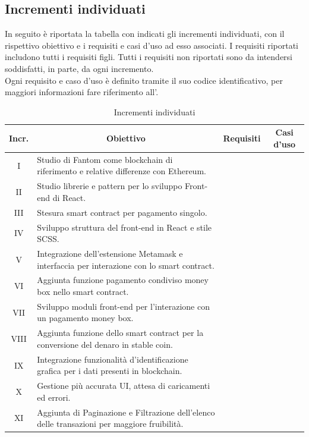 
\subsection{Incrementi individuati} \label{subsection:incrementi}
In seguito è riportata la tabella con indicati gli incrementi individuati, con il rispettivo obiettivo e i requisiti e casi d'uso ad esso associati. 
I requisiti riportati includono tutti i requisiti figli. Tutti i requisiti non riportati sono da intendersi soddisfatti, in parte, da 
ogni incremento. \\
Ogni requisito e caso d'uso è definito tramite il suo codice identificativo, per maggiori informazioni fare riferimento all'\docNameVersionAdR{}.

\begin{table}[H]
  \centering
  \renewcommand{\arraystretch}{1.8}
  \begin{tabular}{c|p{8cm}|c|c}
    \rowcolor[HTML]{125E28}
    \color[HTML]{FFFFFF}\textbf{Incr.}
    & \multicolumn{1}{c}{\color[HTML]{FFFFFF}\textbf{Obiettivo}}
    & \color[HTML]{FFFFFF}\textbf{Requisiti}
    & \color[HTML]{FFFFFF}\textbf{Casi d'uso}\\
    \hline
    I & Studio di Fantom come blockchain di riferimento e relative differenze con Ethereum. & & \\
    II & Studio librerie e pattern per lo sviluppo Front-end di React. & & \\
    III & Stesura smart contract per pagamento singolo. & & \\
    IV & Sviluppo struttura del front-end in React e stile SCSS. & & \\
    V & Integrazione dell'estensione Metamask e interfaccia per interazione con lo smart contract. & & \\
    VI & Aggiunta funzione pagamento condiviso money box nello smart contract. & & \\
    VII & Sviluppo moduli front-end per l'interazione con un pagamento money box. & & \\
    VIII & Aggiunta funzione dello smart contract per la conversione del denaro in stable coin. & & \\
    IX & Integrazione funzionalità d'identificazione grafica per i dati presenti in blockchain. & & \\
    X & Gestione più accurata UI, attesa di caricamenti ed errori. & & \\
    XI & Aggiunta di Paginazione e Filtrazione dell'elenco delle transazioni per maggiore fruibilità. & & \\
  \end{tabular}
  \caption{Incrementi individuati}
\end{table}